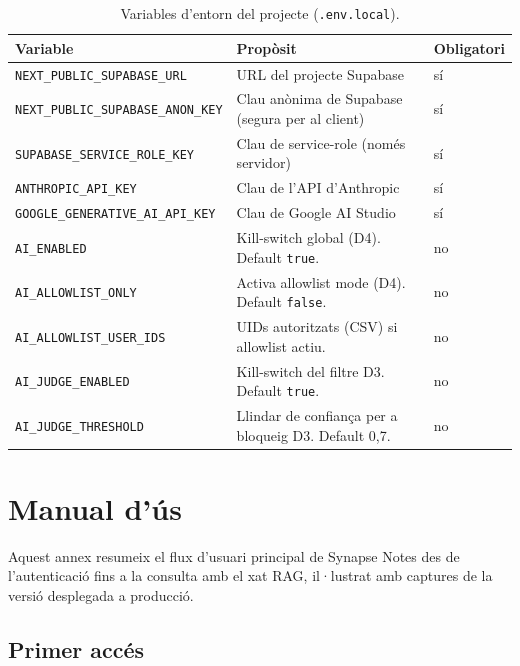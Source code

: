 \begin{table}[H]
    \centerfloat
    \footnotesize
    \caption{Variables d'entorn del projecte (\texttt{.env.local}).}
    \label{tab:env-vars}
    \begin{tabular}{@{}l>{\raggedright\arraybackslash}p{6.5cm}l@{}}
        \toprule
        Variable & Propòsit & Obligatori \\
        \midrule
        \texttt{NEXT\_PUBLIC\_SUPABASE\_URL} & URL del projecte Supabase & sí \\
        \texttt{NEXT\_PUBLIC\_SUPABASE\_ANON\_KEY} & Clau anònima de Supabase (segura per al client) & sí \\
        \texttt{SUPABASE\_SERVICE\_ROLE\_KEY} & Clau de service-role (només servidor) & sí \\
        \texttt{ANTHROPIC\_API\_KEY} & Clau de l'API d'Anthropic & sí \\
        \texttt{GOOGLE\_GENERATIVE\_AI\_API\_KEY} & Clau de Google AI Studio & sí \\
        \texttt{AI\_ENABLED} & Kill-switch global (D4). Default \texttt{true}. & no \\
        \texttt{AI\_ALLOWLIST\_ONLY} & Activa allowlist mode (D4). Default \texttt{false}. & no \\
        \texttt{AI\_ALLOWLIST\_USER\_IDS} & UIDs autoritzats (CSV) si allowlist actiu. & no \\
        \texttt{AI\_JUDGE\_ENABLED} & Kill-switch del filtre D3. Default \texttt{true}. & no \\
        \texttt{AI\_JUDGE\_THRESHOLD} & Llindar de confiança per a bloqueig D3. Default 0{,}7. & no \\
        \bottomrule
    \end{tabular}
\end{table}

\chapter{Manual d'ús}
\label{ch:annex-usage}

Aquest annex resumeix el flux d'usuari principal de Synapse Notes des de l'autenticació fins a la consulta amb el xat RAG, il·lustrat amb captures de la versió desplegada a producció.

\section*{Primer accés}

